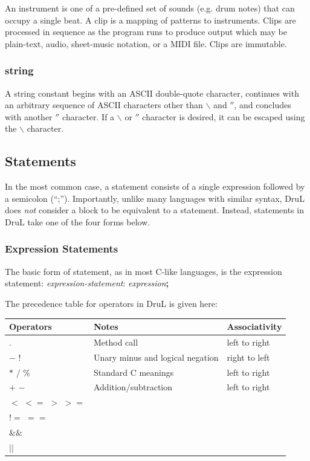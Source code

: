 \documentclass[11pt,twoside]{article}
\begin{document}
An instrument is one of a pre-defined set of sounds (e.g. drum notes) that can occupy a single beat.
A clip is a mapping of patterns to instruments. Clips are processed in sequence as the program runs to produce output which may be plain-text, audio, sheet-music notation, or a MIDI file.  Clips are immutable.

\subsubsection{string}

A string constant begins with an ASCII double-quote character, continues 
with an arbitrary sequence of ASCII characters other than $\backslash$ and $''$, 
and concludes with another $''$ character.  If a $\backslash$ or $''$ character is 
desired, it can be escaped using the $\backslash$ character.





\subsection{Statements}

In the most common case, a statement consists of a single expression followed by a semicolon (``;'').  Importantly, unlike many languages with similar syntax, DruL does \emph{not} consider a block to be equivalent to a statement.  Instead, statements in DruL take one of the four forms below.

\subsubsection{Expression Statements}

The basic form of statement, as in most C-like languages, is the expression statement: \emph{expression-statement}: \emph{expression}\textbf{;}

The precedence table for operators in DruL is given here:

\begin{tabular}{ l |l| l}
\hline\hline
Operators         & Notes                            & Associativity \\
\hline $ . $      & Method call                      & left to right \\
$-$  $!$          & Unary minus and logical negation & right to left \\
$*$ $/$ $\%$      & Standard C meanings              & left to right \\
$+$ $-$           & Addition/subtraction             & left to right \\
$<$ $<=$ $>$ $>=$ &                                  &               \\
$!=$ $==$         &                                  &               \\
$\&\&$            &                                  &               \\
$||$              &                                  &
\end{tabular}
\end{document}
